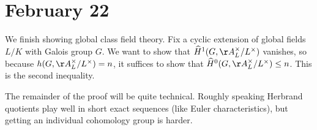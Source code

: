 \documentclass[../notes.tex]{subfiles}
\begin{document}
\section{February 22}

We finish showing global class field theory. Fix a cyclic extension of global fields $L/K$ with Galois group $G$. We want to show that $\widehat H^1(G,\AA_L^\times/L^\times)$ vanishes, so because $h(G,\AA_L^\times/L^\times)=n$, it suffices to show that $\widehat H^0(G,\AA_L^\times/L^\times)\le n$. This is the second inequality.
\begin{remark}
	The remainder of the proof will be quite technical. Roughly speaking Herbrand quotients play well in short exact sequences (like Euler characteristics), but getting an individual cohomology group is harder.
\end{remark}
\end{document}
